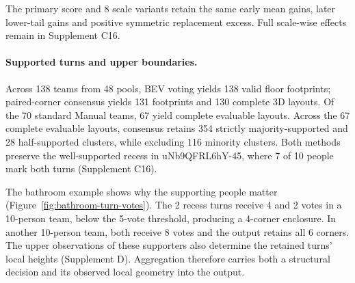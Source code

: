 The primary score and 8 scale variants retain the same early mean gains, later lower-tail gains and positive symmetric replacement excess. Full scale-wise effects remain in Supplement C16.

\paragraph{Supported turns and upper boundaries.}
\label{sec:method-validation}
Across 138 teams from 48 pools, BEV voting yields 138 valid floor footprints; paired-corner consensus yields 131 footprints and 130 complete 3D layouts. Of the 70 standard Manual teams, 67 yield complete evaluable layouts. Across the 67 complete evaluable layouts, consensus retains 354 strictly majority-supported and 28 half-supported clusters, while excluding 116 minority clusters. Both methods preserve the well-supported recess in uNb9QFRL6hY-45, where 7 of 10 people mark both turns (Supplement C16).

The bathroom example shows why the supporting people matter (Figure~\ref{fig:bathroom-turn-votes}). The 2 recess turns receive 4 and 2 votes in a 10-person team, below the 5-vote threshold, producing a 4-corner enclosure. In another 10-person team, both receive 8 votes and the output retains all 6 corners. The upper observations of these supporters also determine the retained turns' local heights (Supplement D). Aggregation therefore carries both a structural decision and its observed local geometry into the output.


